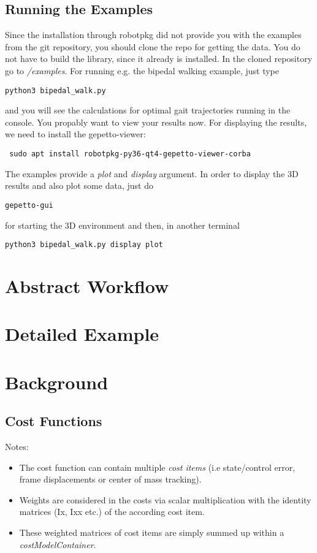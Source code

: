 \subsection{Running the Examples}
Since the installation through robotpkg did not provide you with the examples from the git repository, you should clone the repo \cite{crocoddylweb} for getting the data. You do not have to build the library, since it already is installed. 
In the cloned repository go to \textit{/examples}. For running e.g. the bipedal walking example, just type
\begin{verbatim}
python3 bipedal_walk.py
\end{verbatim}
and you will see the calculations for optimal gait trajectories running in the console. 
You propably want to view your results now. For displaying the results, we need to install the gepetto-viewer:
\begin{verbatim}
 sudo apt install robotpkg-py36-qt4-gepetto-viewer-corba
\end{verbatim}
The examples provide a \textit{plot} and \textit{display} argument. In order to display the 3D results and also plot some data, just do 
\begin{verbatim}
gepetto-gui
\end{verbatim}
for starting the 3D environment and then, in another terminal
\begin{verbatim}
python3 bipedal_walk.py display plot
\end{verbatim}


\section{Abstract Workflow}
\section{Detailed Example}
\section{Background}
\subsection{Cost Functions}
Notes:
\begin{itemize}
\item The cost function can contain multiple \textit{cost items} (i.e state/control error, frame displacements or center of mass tracking).
\item Weights are considered in the costs via scalar multiplication with the identity matrices (Ix, Ixx etc.) of the according cost item. 
\item These weighted matrices of cost items are simply summed up within a \textit{costModelContainer}.
\end{itemize}

